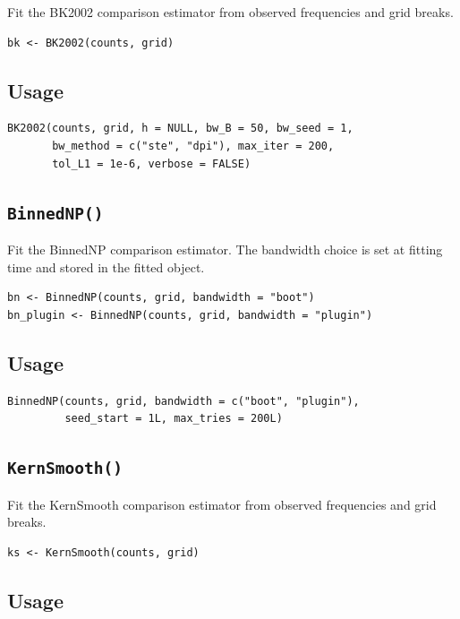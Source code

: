 \documentclass[11pt]{article}
\begin{document}
Fit the BK2002 comparison estimator from observed frequencies and grid breaks.

\begin{lstlisting}
bk <- BK2002(counts, grid)
\end{lstlisting}

\subsection*{Usage}

\begin{lstlisting}
BK2002(counts, grid, h = NULL, bw_B = 50, bw_seed = 1,
       bw_method = c("ste", "dpi"), max_iter = 200,
       tol_L1 = 1e-6, verbose = FALSE)
\end{lstlisting}

\subsection{\texttt{BinnedNP()}}

Fit the BinnedNP comparison estimator. The bandwidth choice is set at fitting
time and stored in the fitted object.

\begin{lstlisting}
bn <- BinnedNP(counts, grid, bandwidth = "boot")
bn_plugin <- BinnedNP(counts, grid, bandwidth = "plugin")
\end{lstlisting}

\subsection*{Usage}

\begin{lstlisting}
BinnedNP(counts, grid, bandwidth = c("boot", "plugin"),
         seed_start = 1L, max_tries = 200L)
\end{lstlisting}

\subsection{\texttt{KernSmooth()}}

Fit the KernSmooth comparison estimator from observed frequencies and grid
breaks.

\begin{lstlisting}
ks <- KernSmooth(counts, grid)
\end{lstlisting}

\subsection*{Usage}
\end{document}
